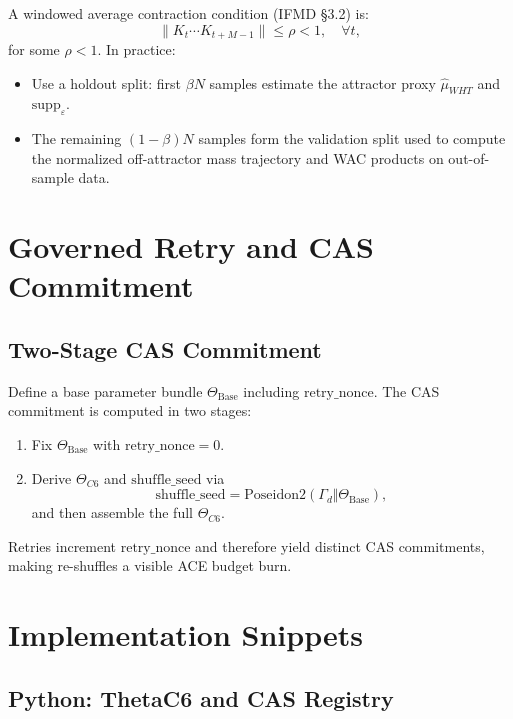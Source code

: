 \documentclass[11pt]{article}
\begin{document}
A windowed average contraction condition (IFMD §3.2) is:
\[
  \|K_t \cdots K_{t+M-1}\| \le \rho < 1, \quad \forall t,
\]
for some $\rho < 1$. In practice:
\begin{itemize}[noitemsep]
  \item Use a holdout split: first $\beta N$ samples estimate
  the attractor proxy $\hat{\mu}_{WHT}$ and $\text{supp}_\varepsilon$.
  \item The remaining $(1-\beta)N$ samples form the validation split used
  to compute the normalized off-attractor mass trajectory and WAC products
  on out-of-sample data.
\end{itemize}

\section{Governed Retry and CAS Commitment}

\subsection{Two-Stage CAS Commitment}

Define a base parameter bundle $\Theta_{\text{Base}}$ including
$\text{retry\_nonce}$. The CAS commitment is computed in two stages:
\begin{enumerate}[noitemsep]
  \item Fix $\Theta_{\text{Base}}$ with $\text{retry\_nonce} = 0$.
  \item Derive $\Theta_{C6}$ and $\text{shuffle\_seed}$ via
  \[
    \text{shuffle\_seed} =
    \text{Poseidon2}(\Gamma_d \Vert \Theta_{\text{Base}}),
  \]
  and then assemble the full $\Theta_{C6}$.
\end{enumerate}
Retries increment $\text{retry\_nonce}$ and therefore yield distinct
CAS commitments, making re-shuffles a visible ACE budget burn.

\section{Implementation Snippets}

\subsection{Python: ThetaC6 and CAS Registry}
\end{document}
